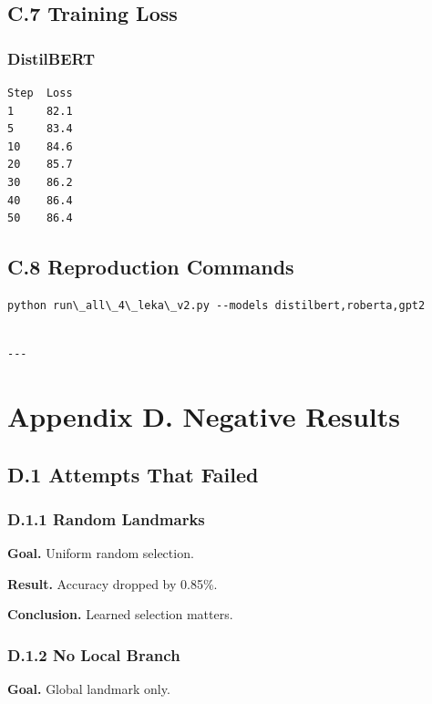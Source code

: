 \subsection{C.7 Training Loss}

\subsubsection{DistilBERT}
\begin{lstlisting}
Step  Loss
1     82.1
5     83.4
10    84.6
20    85.7
30    86.2
40    86.4
50    86.4
\end{lstlisting}

\subsection{C.8 Reproduction Commands}

\begin{lstlisting}
python run\_all\_4\_leka\_v2.py --models distilbert,roberta,gpt2
\end{lstlisting}
\begin{lstlisting}

---
\end{lstlisting}

\section{Appendix D. Negative Results}

\subsection{D.1 Attempts That Failed}

\subsubsection{D.1.1 Random Landmarks}

\textbf{Goal.} Uniform random selection.

\textbf{Result.} Accuracy dropped by 0.85\%.

\textbf{Conclusion.} Learned selection matters.

\subsubsection{D.1.2 No Local Branch}

\textbf{Goal.} Global landmark only.

